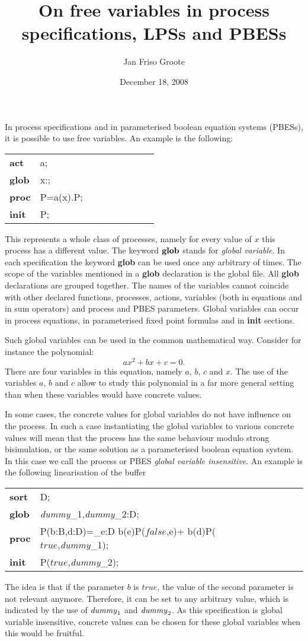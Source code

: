 \documentclass{article}
\author{Jan Friso Groote}
\title{On free variables in process specifications, LPSs and PBESs}
\date{December 18, 2008}
\makeatletter
\newcommand{\ap}{{:}}
\newcommand{\Bool}{{\mathbb B}}
\newcommand{\Nat}{\mathbb{N}}
\newcommand{\true}{\ensuremath{\mathit{true}}}
\newcommand{\false}{\ensuremath{\mathit{false}}}
\newenvironment{mcrl2}%
{\begin{trivlist}
\item\begin{tabular}{@{}>{\bf}p{2.3em}L@{\ }L@{\ }L@{\ }L@{\ }L@{\ }L@{\ }L@{\ }L}}%
{\end{tabular}\end{trivlist}}
\makeatother
\begin{document}
\maketitle
\noindent
In process specifications and in parameterised boolean equation systems (PBESs), it is
possible to use free variables. An example is the following:
\begin{mcrl2}
act  & a;\\
glob & x:\Nat;\\
proc & P=a(x).P;\\
init & P;
\end{mcrl2}
This represents a whole class of processes, namely for every value of
$x$ this process has a different value. The keyword ${\bf glob}$ stands
for {\it global variable}.
In each specification the keyword {\bf glob} can 
be used once any arbitrary of times. The scope of the variables
mentioned in a {\bf glob} declaration is the global file. All {\bf glob}
declarations are grouped together. The names of the variables cannot coincide with other
declared functions, processes, actions, variables (both in equations and 
in sum operators) and process and PBES parameters. 
Global variables can occur in 
process equations, in parameterised fixed point formulas and in {\bf init}
sections.

Such global variables can be used in the common mathematical way. Consider
for instance the polynomial:
\[ax^2+bx+c=0.\]
There are four variables in this equation, namely $a$, $b$, $c$ and $x$.
The use of the variables $a$, $b$ and $c$ allow to study this polynomial in 
a far more general setting than when these variables would have concrete values.

In some cases, the concrete values for global variables do not have influence
on the process. In such a case instantiating the global variables to various concrete
values will mean that the process has the same behaviour modulo strong bisimulation,
or the same solution as a parameterised boolean equation system. In this case
we call the process or PBES {\it global variable insensitive}. 
An example is the following linearisation of the buffer
\begin{mcrl2}
sort & D;\\
glob & {\it dummy}_1,{\it dummy}_2:D;\\
proc& P(b:\Bool,d\ap D)=\sum_{e\ap D} b(e){\it \cdot}P(\false,e)+
\neg b(d){\cdot}P(\true,{\it dummy}_1);\\
init& P(\true,{\it dummy}_2);
\end{mcrl2}
The idea is that if the parameter $b$ is $\true$, the value of the second parameter
is not relevant anymore. Therefore, it can be set to any arbitrary value, which is 
indicated by the use of ${\it dummy}_1$ and ${\it dummy}_2$. As this specification is
global variable insensitive, concrete values can be chosen for these global variables
when this would be fruitful. 
\end{document}
